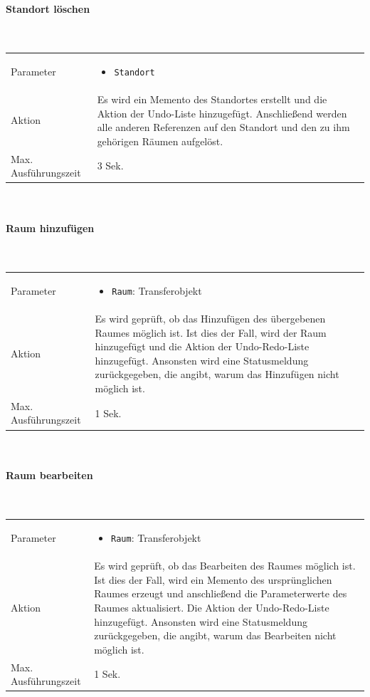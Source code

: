 \documentclass[fontsize=12pt,paper=a4,twoside]{scrartcl}
\begin{document}
\paragraph{Standort löschen}\mbox{}\\
\begin{tabularx}{\textwidth}{p{4cm}X}
Parameter & \begin{itemize}[itemsep=0pt, leftmargin = 0.5cm]
			\item \texttt{Standort}
			\end{itemize}\\
Aktion & Es wird ein Memento des Standortes erstellt und die Aktion der Undo-Liste hinzugefügt. Anschließend werden alle anderen Referenzen auf den Standort und den zu ihm gehörigen Räumen aufgelöst. \\
Max. Ausführungszeit & 3 Sek. 
\end{tabularx}\\

\paragraph{Raum hinzufügen}\mbox{}\\
\begin{tabularx}{\textwidth}{p{4cm}X}
Parameter & \begin{itemize}[itemsep=0pt, leftmargin = 0.5cm]
			\item \texttt{Raum}: Transferobjekt
			\end{itemize}\\
Aktion & Es wird geprüft, ob das Hinzufügen des übergebenen Raumes möglich ist. Ist dies der Fall, wird der Raum hinzugefügt und die Aktion der Undo-Redo-Liste hinzugefügt. Ansonsten wird eine Statusmeldung zurückgegeben, die angibt, warum das Hinzufügen nicht möglich ist. \\
Max. Ausführungszeit & 1 Sek. 
\end{tabularx}\\


\paragraph{Raum bearbeiten}\mbox{}\\
\begin{tabularx}{\textwidth}{p{4cm}X}
Parameter & \begin{itemize}[itemsep=0pt, leftmargin = 0.5cm]
			\item \texttt{Raum}: Transferobjekt
			\end{itemize}\\
Aktion & Es wird geprüft, ob das Bearbeiten des Raumes möglich ist. Ist dies der Fall, wird ein Memento des ursprünglichen Raumes erzeugt und anschließend die Parameterwerte des Raumes aktualisiert. Die Aktion der Undo-Redo-Liste hinzugefügt. Ansonsten wird eine Statusmeldung zurückgegeben, die angibt, warum das Bearbeiten nicht möglich ist. \\
Max. Ausführungszeit & 1 Sek. 
\end{tabularx}\\
\end{document}
